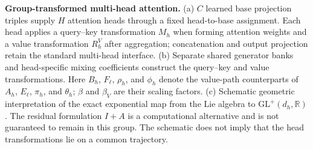 \caption{\textbf{Group-transformed multi-head attention.}
(a) $C$ learned base projection triples supply $H$ attention heads through a fixed head-to-base assignment. Each head applies a query--key transformation $M_h$ when forming attention weights and a value transformation $R_h^V$ after aggregation; concatenation and output projection retain the standard multi-head interface.
(b) Separate shared generator banks and head-specific mixing coefficients construct the query--key and value transformations. Here $B_h$, $F_\ell$, $\rho_h$, and $\phi_h$ denote the value-path counterparts of $A_h$, $E_\ell$, $\pi_h$, and $\theta_h$; $\beta$ and $\beta_V$ are their scaling factors.
(c) Schematic geometric interpretation of the exact exponential map from the Lie algebra to $\mathrm{GL}^{+}(d_h,\mathbb{R})$. The residual formulation $I+A$ is a computational alternative and is not guaranteed to remain in this group. The schematic does not imply that the head transformations lie on a common trajectory.}
\label{fig:gt-mha-architecture}
